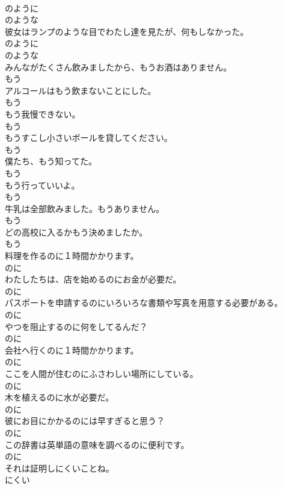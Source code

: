 \documentclass[8pt]{extreport}
\begin{document}
\begin{CJK}{UTF8}{min}
\\	のように 
\\	のような
\\	彼女はランプのような目でわたし達を見たが、何もしなかった。	
\\	のように 
\\	のような
\\	みんながたくさん飲みましたから、もうお酒はありません。	
\\	もう
\\	アルコールはもう飲まないことにした。	
\\	もう
\\	もう我慢できない。	
\\	もう
\\	もうすこし小さいボールを貸してください。	
\\	もう
\\	僕たち、もう知ってた。	
\\	もう
\\	もう行っていいよ。	
\\	もう
\\	牛乳は全部飲みました。もうありません。	
\\	もう
\\	どの高校に入るかもう決めましたか。	
\\	もう
\\	料理を作るのに１時間かかります。	
\\	のに
\\	わたしたちは、店を始めるのにお金が必要だ。	
\\	のに
\\	パスポートを申請するのにいろいろな書類や写真を用意する必要がある。	
\\	のに
\\	やつを阻止するのに何をしてるんだ？	
\\	のに
\\	会社へ行くのに１時間かかります。	
\\	のに
\\	ここを人間が住むのにふさわしい場所にしている。	
\\	のに
\\	木を植えるのに水が必要だ。	
\\	のに
\\	彼にお目にかかるのには早すぎると思う？	
\\	のに
\\	この辞書は英単語の意味を調べるのに便利です。	
\\	のに
\\	それは証明しにくいことね。	
\\	にくい

\end{CJK}
\end{document}
